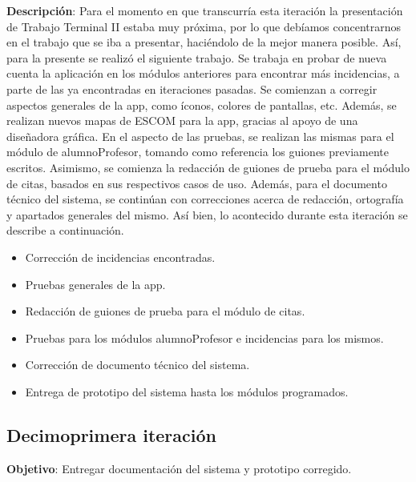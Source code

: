 \noindent
\textbf{Descripción}: Para el momento en que transcurría esta iteración la presentación de Trabajo Terminal II estaba muy próxima, por lo que debíamos concentrarnos en el trabajo que se iba a presentar, haciéndolo de la mejor manera posible. Así, para la presente se realizó el siguiente trabajo. 
\newline
\newline
Se trabaja en probar de nueva cuenta la aplicación en los módulos anteriores para encontrar más incidencias, a parte de las ya encontradas en iteraciones pasadas. Se comienzan a corregir aspectos generales de la app, como íconos, colores de pantallas, etc. Además, se realizan nuevos mapas de ESCOM para la app, gracias al apoyo de una diseñadora gráfica.
\newline
En el aspecto de las pruebas, se realizan las mismas para el módulo de alumnoProfesor, tomando como referencia los guiones previamente escritos. Asimismo, se comienza la redacción de guiones de prueba para el módulo de citas, basados en sus respectivos casos de uso. 
\newline
Además, para el documento técnico del sistema, se continúan con correcciones acerca de redacción, ortografía y apartados generales del mismo.
\newline
Así bien, lo acontecido durante esta iteración se describe a continuación. 
\begin{itemize}
	\item Corrección de incidencias encontradas.
	\item Pruebas generales de la app. 
	\item Redacción de guiones de prueba para el módulo de citas.
	\item Pruebas para los módulos alumnoProfesor e incidencias para los mismos.
	\item Corrección de documento técnico del sistema.
	\item Entrega de prototipo del sistema hasta los módulos programados.
\end{itemize}


\subsection{Decimoprimera iteración}

\noindent
\textbf{Objetivo}: Entregar documentación del sistema y prototipo corregido.
\newline

